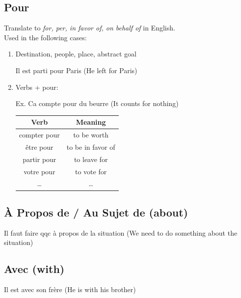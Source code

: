 \documentclass{book}
\begin{document}
        \subsection{Pour}
            Translate to \textit{for, per, in favor of, on behalf of} in English. \\
            Used in the following cases:
            \begin{enumerate}
                \item Destination, people, place, abstract goal
                    \begin{center}
                        Il est parti pour Paris (He left for Paris)
                    \end{center}
                \item Verbs + pour:
                    \begin{center}
                        Ex. Ca compte pour du beurre (It counts for nothing) \\
                        \begin{tabular}{|c|c|}
                            \hline
                            \textbf{Verb} & \textbf{Meaning}\\
                            \hline
                            compter pour & to be worth \\
                            être pour & to be in favor of \\
                            partir pour & to leave for \\
                            votre pour & to vote for \\
                            \dots & \dots \\ 
                            \hline
                        \end{tabular}
                    \end{center}
            \end{enumerate}
            
        \subsection{À Propos de / Au Sujet  de (about)}
            \begin{center}
                Il faut faire qqc à propos de la situation (We need to do something about the situation)
            \end{center}
        
        \subsection{Avec (with)}
            \begin{center}
                Il est avec son frère (He is with his brother)
            \end{center}
\end{document}
